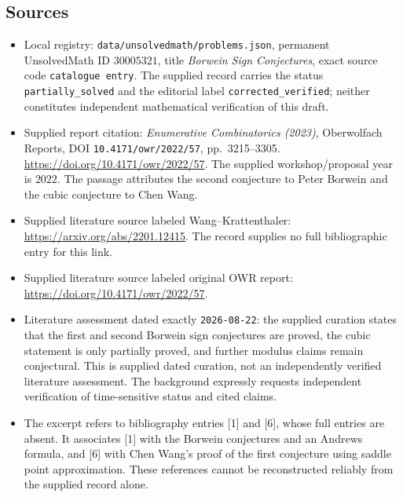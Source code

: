 \documentclass[11pt]{article}
\begin{document}
\subsection{Sources}
\begin{itemize}
\item Local registry: \texttt{data/unsolvedmath/problems.json}, permanent UnsolvedMath ID \(30005321\), title \emph{Borwein Sign Conjectures}, exact source code \texttt{catalogue entry}. The supplied record carries the status \texttt{partially\_solved} and the editorial label \texttt{corrected\_verified}; neither constitutes independent mathematical verification of this draft.
\item Supplied report citation: \emph{Enumerative Combinatorics (2023)}, Oberwolfach Reports, DOI \texttt{10.4171/owr/2022/57}, pp.~3215--3305. \url{https://doi.org/10.4171/owr/2022/57}. The supplied workshop/proposal year is \(2022\). The passage attributes the second conjecture to Peter Borwein and the cubic conjecture to Chen Wang.
\item Supplied literature source labeled Wang--Krattenthaler: \url{https://arxiv.org/abs/2201.12415}. The record supplies no full bibliographic entry for this link.
\item Supplied literature source labeled original OWR report: \url{https://doi.org/10.4171/owr/2022/57}.
\item Literature assessment dated exactly \texttt{2026-08-22}: the supplied curation states that the first and second Borwein sign conjectures are proved, the cubic statement is only partially proved, and further modulus claims remain conjectural. This is supplied dated curation, not an independently verified literature assessment. The background expressly requests independent verification of time-sensitive status and cited claims.
\item The excerpt refers to bibliography entries [1] and [6], whose full entries are absent. It associates [1] with the Borwein conjectures and an Andrews formula, and [6] with Chen Wang's proof of the first conjecture using saddle point approximation. These references cannot be reconstructed reliably from the supplied record alone.
\end{itemize}
\end{document}
